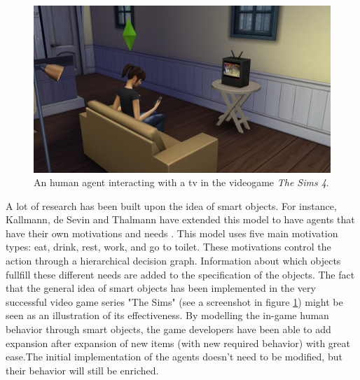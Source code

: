 \documentclass[11pt, a4paper]{book}
\begin{document}
\begin{figure}[h]
\centering
\includegraphics[width=.6\textwidth]{./thesims.png}
\caption{An human agent interacting with a tv in the videogame \emph{The Sims 4}.}
\label{fig:thesims}
\end{figure}

A lot of research has been built upon the idea of smart objects. For instance, Kallmann, de Sevin and Thalmann have extended this model to have agents that have their own motivations and needs \cite{Kallmann00constructingvirtual}. This model uses five main motivation types: eat, drink, rest, work, and go to toilet. These motivations control the action through a hierarchical decision graph. Information about which objects fullfill these different needs are added to the specification of the objects.
The fact that the general idea of smart objects has been implemented in the very successful video game series "The Sims" (see a screenshot in figure \ref{fig:thesims}) might be seen as an illustration of its effectiveness. By modelling the in-game human behavior through smart objects, the game developers have been able to add expansion after expansion of new items (with new required behavior) with great ease.The initial implementation of the agents doesn't need to be modified, but their behavior will still be enriched. \\
\end{document}

